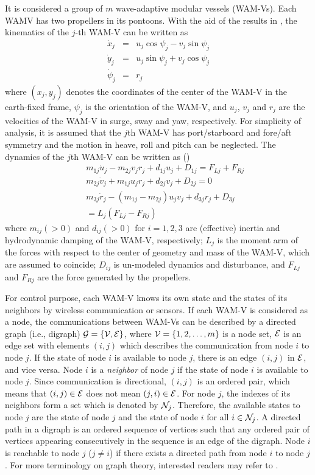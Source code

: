 \documentclass[letterpaper, 10 pt, conference]{ieeeconf}  %
\begin{document}
It is considered a group of $m$ wave-adaptive modular vessels (WAM-Vs). Each WAMV has  two propellers in its pontoons. With the aid of the results in \cite{fos94},
the kinematics of the $j$-th WAM-V can be written as
\begin{eqnarray}
\dot{x}_j&=&u_j\cos\psi_j  -v_j\sin\psi_j \label{e1a}\\
\dot{y}_j&=&u_j\sin\psi_j +v_j\cos\psi_j \label{e1b}\\
\dot{\psi}_j&=&r_j \label{e1c}
\end{eqnarray}
where $(x_j, y_j)$ denotes the coordinates of the center of the WAM-V in the earth-fixed frame, $\psi_j$ is the
orientation of the WAM-V, and $u_j$, $v_j$ and $r_j$ are the
velocities of the WAM-V in surge, sway and yaw,
respectively.  For simplicity of analysis, it is assumed that the $j$th WAM-V has port/starboard and fore/aft symmetry and the motion in heave, roll and pitch can be neglected. The dynamics of the $j$th WAM-V can be
written as (\cite{fos94})
\begin{eqnarray}
&&m_{1j}\dot{u}_j-m_{2j}v_jr_j+
d_{1j}u_j+D_{1j}=F_{Lj}+F_{Rj} \label{e2a}\\
&&m_{2j}\dot{v}_j+m_{1j}u_jr_j+d_{2j}v_j+D_{2j}=0 \label{e2b}\\
&&m_{3j}\dot{r}_j-(m_{1j}-m_{2j})u_jv_j+d_{3j}r_j+D_{3j}\nonumber\\
&&=
L_j(F_{Lj}-F_{Rj})
 \label{e2c}
\end{eqnarray}
where $m_{ij}(>0)$  and $d_{ij}(>0)$  for $i=1,2,3$ are (effective)
 inertia and  hydrodynamic damping of the WAM-V,
respectively; $L_j$ is the moment arm of the forces with respect to the center of geometry and mass of the WAM-V, which are assumed to coincide; $D_{ij}$ is un-modeled dynamics and disturbance, and $F_{Lj}$ and $F_{Rj}$ are the force generated by the propellers. 


For control purpose, each WAM-V knows its own state and
the states of its neighbors by wireless communication or sensors. If each WAM-V is considered as a node, the communications between WAM-Vs
can be described by a directed graph (i.e., digraph) ${\cal G}=\{{\cal V},{\cal E}\}$,
where ${\cal V}=\{1,2,\ldots,m\}$ is a node set, ${\cal E}$ is an
edge set with elements $(i,j)$ which describes the communication
from node $i$ to node $j$. If the state of node $i$ is available
to node $j$, there is an edge $(i,j)$ in ${\cal E}$, and vice
versa. Node $i$ is a {\em neighbor} of node $j$ if the
state of node $i$ is available to node $j$. Since communication
is directional, $(i,j)$ is an ordered pair, which means that
$(i,j)\in {\cal E}$ does not mean $(j,i)\in {\cal E}$. For node
$j$, the indexes of its neighbors form a set which is denoted by
${\cal N}_j$. Therefore, the available states to node $j$ are the state of node $j$ and the state of node $i$ for
all $i\in{\cal N}_j$.  A directed path
in a digraph is an ordered sequence of vertices such that any ordered pair of
vertices appearing consecutively in the sequence is an edge of the digraph.
Node $i$ is reachable to node $j$ ($j\not=i$) if there exists a directed path from node $i$ to node $j$.
For more terminology on graph theory, interested
readers may refer to \cite{chu97,mer98}.
\end{document}
